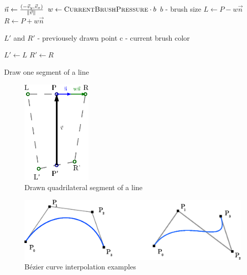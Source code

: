 \begin{pseudocode}
	\begin{algorithmic}
              \State $ \vec{n} \gets \frac{(-\vec{v}_y, \vec{v}_x)}{\norm{\vec{v}}} $        
              \State $ w \gets \Call{CurrentBrushPressure}{} \cdot b $ \Comment $b$ - brush size
              \State $L \gets P - w\vec{n}$
              \State $R \gets P + w\vec{n}$

              \State {}
              \State {} \Comment $L'$ and $R'$ - previousely drawn point
              \State {}
              \State {}
              \State {}
              \State {}
              \State {} \Comment c - current brush color

              \State $L' \gets L$
              \State $R' \gets R$
          \EndFunction
       \end{algorithmic}
  	   \caption{Draw one segment of a line}
      \label{alg:draw-segment-quadrilateral}
   \end{pseudocode}

   
  \begin{figure}
  	\centering
      \includegraphics[height=50mm]{../img/draw-segment-quadrilateral.eps}
      \caption{Drawn quadrilateral segment of a line}
      \label{fig:draw-segment-quadrilateral}
  \end{figure}


\begin{figure}
	\centering
  		\includegraphics[width=130mm]{../img/bezier_curves.eps}
  		\caption{Bézier curve interpolation examples}
  		\label{fig:bezier-curve}
\end{figure}

